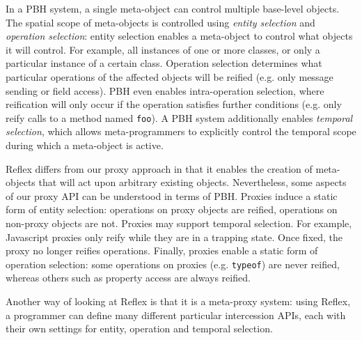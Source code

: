 \documentclass{acm_proc_article-sp}
\newcommand{\noSuchMethod}{\texttt{\_\_noSuchMethod\_\_}}
\begin{document}
In a PBH system, a single meta-object can control multiple base-level objects. The spatial scope of meta-objects is controlled using \emph{entity selection} and \emph{operation selection}: entity selection enables a meta-object to control what objects it will control. For example, all instances of one or more classes, or only a particular instance of a certain class. Operation selection determines what particular operations of the affected objects will be reified (e.g. only message sending or field access). PBH even enables intra-operation selection, where reification will only occur if the operation satisfies further conditions (e.g. only reify calls to a method named \texttt{foo}). A PBH system additionally enables \emph{temporal selection}, which allows meta-programmers to explicitly control the temporal scope during which a meta-object is active.

Reflex differs from our proxy approach in that it enables the creation of meta-objects that will act upon arbitrary existing objects. Nevertheless, some aspects of our proxy API can be understood in terms of PBH. Proxies induce a static form of entity selection: operations on proxy objects are reified, operations on non-proxy objects are not. Proxies may support temporal selection. For example, Javascript proxies only reify while they are in a trapping state. Once fixed, the proxy no longer reifies operations. Finally, proxies enable a static form of operation selection: some operations on proxies (e.g. \texttt{typeof}) are never reified, whereas others such as property access are always reified.

Another way of looking at Reflex is that it is a meta-proxy system: using Reflex, a programmer can define many different particular intercession APIs, each with their own settings for entity, operation and temporal selection.


\end{document}
